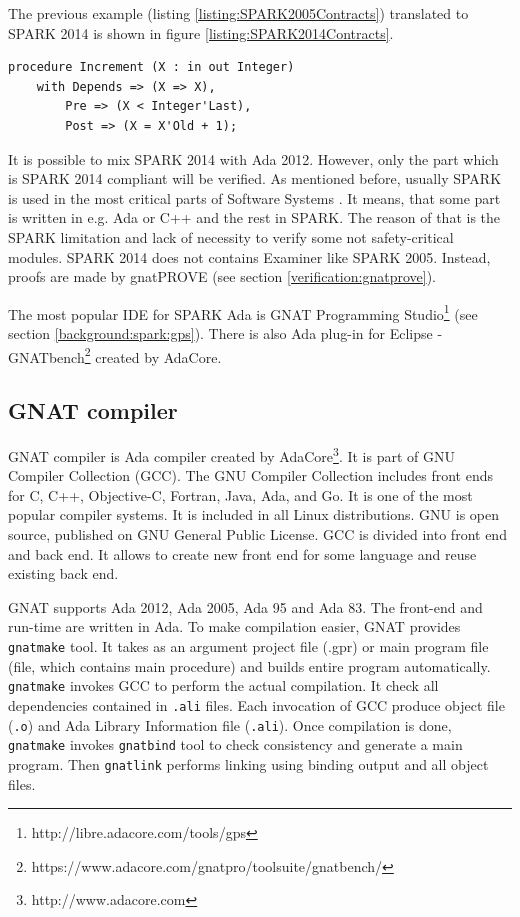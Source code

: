 The previous example (listing \ref{listing:SPARK2005Contracts}) translated to SPARK 2014 is shown in figure \ref{listing:SPARK2014Contracts}.

\singlespacing
\begin{lstlisting}[language=ada2012, frame=single, gobble=0, caption={Sample SPARK 2014 procedure and Code Contracts}]
	procedure Increment (X : in out Integer)
	with Depends => (X => X),
		Pre => (X < Integer'Last),
		Post => (X = X'Old + 1);
\end{lstlisting} 
\label{listing:SPARK2014Contracts}
\doublespacing

It is possible to mix SPARK 2014 with Ada 2012. However, only the part which is SPARK 2014 compliant will be verified. As mentioned before, usually SPARK is used in the most critical parts of Software Systems \cite{Spark:IndustrialExp}. It means, that some part is written in e.g. Ada or C++ and the rest in SPARK. The reason of that is the SPARK limitation and lack of necessity to verify some not safety-critical modules. SPARK 2014 does not contains Examiner like SPARK 2005. Instead, proofs are made by gnatPROVE (see section \ref{verification:gnatprove}).

The most popular IDE for SPARK Ada is GNAT Programming Studio\footnote{http://libre.adacore.com/tools/gps} (see section \ref{background:spark:gps}). There is also Ada plug-in for Eclipse - GNATbench\footnote{https://www.adacore.com/gnatpro/toolsuite/gnatbench/} created by AdaCore. 



\subsection{GNAT compiler}
\label{background:spark:gnat}

GNAT compiler is Ada compiler created by AdaCore\footnote{http://www.adacore.com}. It is part of GNU Compiler Collection (GCC). The GNU Compiler Collection includes front ends for C, C++, Objective-C, Fortran, Java, Ada, and Go. It is one of the most popular compiler systems. It is included in all Linux distributions. GNU is open source, published on GNU General Public License. GCC is divided into front end and back end. It allows to create new front end for some language and reuse existing back end.

GNAT supports Ada 2012, Ada 2005, Ada 95 and Ada 83. The front-end and run-time are written in Ada. To make compilation easier, GNAT provides \lstinline{gnatmake} tool. It takes as an argument project file (.gpr) or main program file (file, which contains main procedure) and builds entire program automatically. \lstinline{gnatmake} invokes GCC to perform the actual compilation. It check all dependencies contained in \lstinline{.ali} files. Each invocation of GCC produce object file (\lstinline{.o}) and Ada Library Information file (\lstinline{.ali}). Once compilation is done, \lstinline{gnatmake} invokes \lstinline{gnatbind} tool to check consistency and generate a main program. Then \lstinline{gnatlink} performs linking using binding output and all object files.

